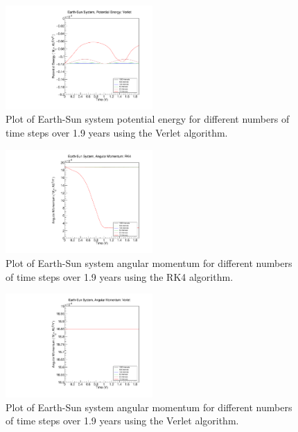 \documentclass[a4paper,12pt]{report}
\begin{document}
 \begin{figure}[H]
 \centering
   \includegraphics[width=0.5\textwidth]{ESVerlet_pe.pdf}
  \caption{Plot of Earth-Sun system potential energy for different numbers of time steps over 1.9 years using the Verlet algorithm.}
  \label{fig:ESVerlet_pe}
 \end{figure}

\begin{figure}[H]
 \centering
   \includegraphics[width=0.5\textwidth]{ESRK4_l.pdf}
  \caption{Plot of Earth-Sun system angular momentum for different numbers of time steps over 1.9 years using the RK4 algorithm.}
  \label{fig:ESRK4_l}
 \end{figure}



\begin{figure}[H]
 \centering
   \includegraphics[width=0.5\textwidth]{ESVerlet_l.pdf}
  \caption{Plot of Earth-Sun system angular momentum for different numbers of time steps over 1.9 years using the Verlet algorithm.}
  \label{fig:ESVerlet_l}
 \end{figure}
 
\end{document}
